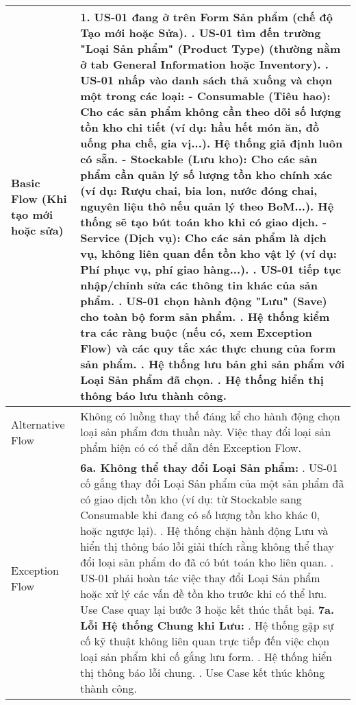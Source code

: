 \begin{longtable}{|m{4cm}|p{11cm}|}
Basic Flow (Khi tạo mới hoặc sửa) & 1. US-01 đang ở trên Form Sản phẩm (chế độ Tạo mới hoặc Sửa). \newline 2. US-01 tìm đến trường "Loại Sản phẩm" (Product Type) (thường nằm ở tab General Information hoặc Inventory). \newline 3. US-01 nhấp vào danh sách thả xuống và chọn một trong các loại: \newline    - \textbf{Consumable (Tiêu hao):} Cho các sản phẩm không cần theo dõi số lượng tồn kho chi tiết (ví dụ: hầu hết món ăn, đồ uống pha chế, gia vị...). Hệ thống giả định luôn có sẵn. \newline    - \textbf{Stockable (Lưu kho):} Cho các sản phẩm cần quản lý số lượng tồn kho chính xác (ví dụ: Rượu chai, bia lon, nước đóng chai, nguyên liệu thô nếu quản lý theo BoM...). Hệ thống sẽ tạo bút toán kho khi có giao dịch. \newline    - \textbf{Service (Dịch vụ):} Cho các sản phẩm là dịch vụ, không liên quan đến tồn kho vật lý (ví dụ: Phí phục vụ, phí giao hàng...). \newline 4. US-01 tiếp tục nhập/chỉnh sửa các thông tin khác của sản phẩm. \newline 5. US-01 chọn hành động "Lưu" (Save) cho toàn bộ form sản phẩm. \newline 6. Hệ thống kiểm tra các ràng buộc (nếu có, xem Exception Flow) và các quy tắc xác thực chung của form sản phẩm. \newline 7. Hệ thống lưu bản ghi sản phẩm với Loại Sản phẩm đã chọn. \newline 8. Hệ thống hiển thị thông báo lưu thành công. \\
\hline
Alternative Flow & Không có luồng thay thế đáng kể cho hành động chọn loại sản phẩm đơn thuần này. Việc thay đổi loại sản phẩm hiện có có thể dẫn đến Exception Flow. \\
\hline
Exception Flow & \textbf{6a. Không thể thay đổi Loại Sản phẩm:} \newline    1. US-01 cố gắng thay đổi Loại Sản phẩm của một sản phẩm đã có giao dịch tồn kho (ví dụ: từ Stockable sang Consumable khi đang có số lượng tồn kho khác 0, hoặc ngược lại). \newline    2. Hệ thống chặn hành động Lưu và hiển thị thông báo lỗi giải thích rằng không thể thay đổi loại sản phẩm do đã có bút toán kho liên quan. \newline    3. US-01 phải hoàn tác việc thay đổi Loại Sản phẩm hoặc xử lý các vấn đề tồn kho trước khi có thể lưu. Use Case quay lại bước 3 hoặc kết thúc thất bại. \newline \textbf{7a. Lỗi Hệ thống Chung khi Lưu:} \newline    1. Hệ thống gặp sự cố kỹ thuật không liên quan trực tiếp đến việc chọn loại sản phẩm khi cố gắng lưu form. \newline    2. Hệ thống hiển thị thông báo lỗi chung. \newline    3. Use Case kết thúc không thành công. \\

\end{longtable}

